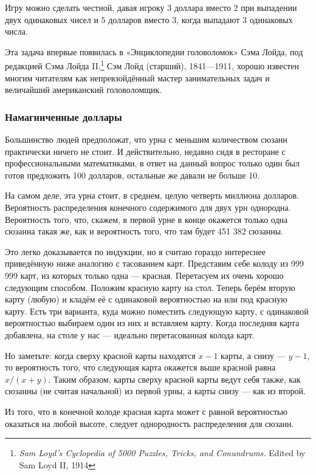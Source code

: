 \medskip

Игру можно сделать честной, давая игроку 3 доллара вместо 2 при выпадении двух одинаковых чисел 
и 5 долларов вместо 3, когда выпадают 3 одинаковых числа.

\medskip

Эта задача впервые появилась в «Энциклопедии головоломок» Сэма Лойда, под редакцией Сэма Лойда II.\footnote{\emph{Sam Loyd’s Cyclopedia of 5000 Puzzles, Tricks, and Conundrums.} Edited by Sam Loyd II, 1914}
Сэм Лойд (старший), 1841---1911, хорошо известен многим читателям как непревзойдённый мастер занимательных задач и величайший американский головоломщик.

\subsubsection*{Намагниченные доллары}%

Большинство людей предположат, что урна с меньшим количеством сюзанн практически ничего не стоит.
И действительно, недавно сидя в ресторане с профессиональными математиками, в ответ на данный вопрос только один был готов предложить 100 долларов, остальные же давали не больше 10.

На самом деле, эта урна стоит, в среднем, целую четверть миллиона долларов.
Вероятность распределения конечного содержимого для двух урн однородна.
Вероятность того, что, скажем, в первой урне в конце окажется только одна сюзанна такая же, как и вероятность того, что там будет 451 382 сюзанны.

Это легко доказывается по индукции, но я считаю гораздо интереснее приведённую ниже аналогию с тасованием карт.
Представим себе колоду из 
999 999 
карт, из которых только одна --- красная.
Перетасуем их очень хорошо следующим способом.
Положим красную карту на стол.
Теперь берём вторую карту (любую) и кладём её с одинаковой вероятностью на или под красную карту.
Есть три варианта, куда можно поместить следующую карту, с одинаковой вероятностью выбираем один из них и вставляем карту.
Когда последняя карта добавлена, на столе у нас --- идеально перетасованная колода карт.

Но заметьте: когда сверху красной карты находятся $x-1$ карты, а снизу --- $y-1$, то вероятность того, что следующая карта окажется выше красной равна $x/(x+y)$.
Таким образом, карты сверху красной карты ведут себя также, как сюзанны (не считая начальной) из первой урны, а карты снизу --- как из второй.

Из того, что в конечной колоде красная карта может с равной вероятностью оказаться на любой высоте, следует однородность распределения для сюзанн.\heart
 
